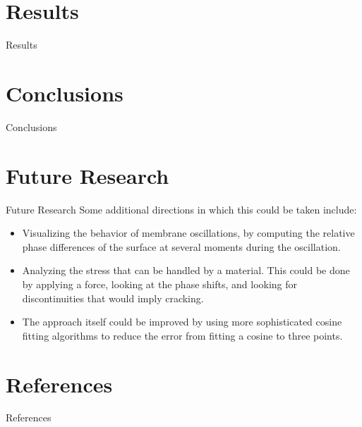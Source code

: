 \documentclass[pdf]{beamer}
\begin{document}
\section{Results}
\begin{frame}{Results}

\end{frame}

\section{Conclusions}
\begin{frame}{Conclusions}

\end{frame}

\section{Future Research}
\begin{frame}{Future Research}
Some additional directions in which this could be taken include:
\begin{itemize}
\item{Visualizing the behavior of membrane oscillations, by computing the relative phase differences of the surface at several moments during the oscillation.}
\item{Analyzing the stress that can be handled by a material. This could be done by applying a force, looking at the phase shifts, and looking for discontinuities that would imply cracking.}
\item{The approach itself could be improved by using more sophisticated cosine fitting algorithms to reduce the error from fitting a cosine to three points.}
\end{itemize}
\end{frame}

\section{References}
\begin{frame}{References}

\end{frame}
\end{document}
